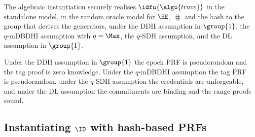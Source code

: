 \begin{theorem}\label{thm:inst} The algebraic instantiation securely realises
$\idfu{\algo{trace}}$ in the standalone model, in the random oracle model for
$\HE$, $\hash$ and the hash to the group that derives the generators, under the DDH assumption in $\group{1}$, the $q$-mDBDHI
assumption with $q = \Max$, the $q$-SDH assumption, and the DL assumption in
$\group{1}$.
\end{theorem}

Under the DDH assumption in $\group{1}$ the epoch PRF is pseudorandom and the
tag proof is zero knowledge. Under the $q$-mDBDHI assumption the tag PRF is
pseudorandom, under the $q$-SDH assumption the credentials are unforgeable, and
under the DL assumption the commitments are binding and the range proofs sound.

\subsection{Instantiating $\ID$ with hash-based PRFs}\label{sec:txid-hash-instantiation}

